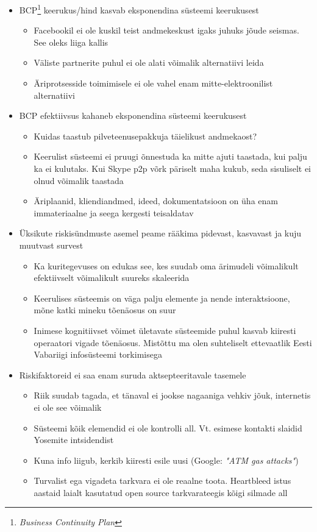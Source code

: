 \documentclass{tufte-book}
\begin{document}
	\begin{itemize}
		\item BCP\footnote{\emph{Business Continuity Plan}} keerukus/hind kasvab eksponendina süsteemi keerukusest
			\begin{itemize}
		\item Facebookil ei ole kuskil teist andmekeskust igaks juhuks jõude seismas. See oleks liiga kallis
		\item Väliste partnerite puhul ei ole alati võimalik alternatiivi leida
		\item Äriprotsesside toimimisele ei ole vahel enam mitte-elektroonilist alternatiivi
	\end{itemize}

		\item BCP efektiivsus kahaneb eksponendina süsteemi keerukusest
			\begin{itemize}
		\item Kuidas taastub pilveteenusepakkuja täielikust andmekaost?
		\item Keerulist süsteemi ei pruugi õnnestuda ka mitte ajuti taastada, kui palju ka ei kulutaks. Kui Skype p2p võrk päriselt maha kukub, seda sisuliselt ei olnud võimalik taastada
		\item Äriplaanid, kliendiandmed, ideed, dokumentatsioon on üha enam immateriaalne ja seega kergesti teisaldatav
	\end{itemize}

		\item Üksikute riskisündmuste asemel peame rääkima pidevast, kasvavast ja kuju muutvast survest
			\begin{itemize}
		\item Ka kuritegevuses on edukas see, kes suudab oma ärimudeli võimalikult efektiivselt võimalikult suureks skaleerida
		\item Keerulises süsteemis on väga palju elemente ja nende interaktsioone, mõne katki mineku tõenäosus on suur
		\item Inimese kognitiivset võimet ületavate süsteemide puhul kasvab kiiresti operaatori vigade tõenäosus. Mistõttu ma olen suhteliselt ettevaatlik Eesti Vabariigi infosüsteemi torkimisega
	\end{itemize}

		\item Riskifaktoreid ei saa enam suruda aktsepteeritavale tasemele
			\begin{itemize}
		\item Riik suudab tagada, et tänaval ei jookse nagaaniga vehkiv jõuk, internetis ei ole see võimalik
		\item Süsteemi kõik elemendid ei ole kontrolli all. Vt. esimese kontakti slaidid Yosemite intsidendist
		\item Kuna info liigub, kerkib kiiresti esile uusi (Google: \emph{"ATM gas attacks"})
		\item Turvalist ega vigadeta tarkvara ei ole reaalne toota. Heartbleed istus aastaid laialt kasutatud open source tarkvarateegis kõigi silmade all
	\end{itemize}

\end{itemize}
\end{document}
